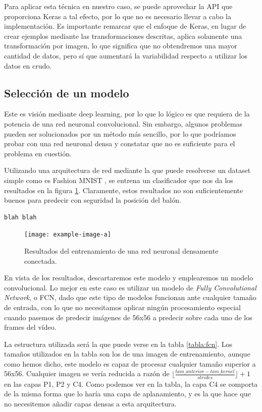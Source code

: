 Para aplicar esta técnica en nuestro caso, se puede aprovechar la API que proporciona Keras a tal efecto, por lo que no es necesario llevar a cabo la implementación. Es importante remarcar que el enfoque de Keras, en lugar de crear ejemplos mediante las transformaciones descritas, aplica solamente una transformación por imagen, lo que significa que no obtendremos una mayor cantidad de datos, pero sí que aumentará la variabilidad respecto a utilizar los datos en crudo.

\subsection{Selección de un modelo}

Este es visión mediante deep learning, por lo que lo lógico es que requiera de la potencia de una red neuronal convolucional. Sin embargo, algunos problemas pueden ser solucionados por un método más sencillo, por lo que podríamos probar con una red neuronal densa y constatar que no es suficiente para el problema en cuestión.

Utilizando una arquitectura de red mediante la que puede resolverse un dataset simple como es Fashion MNIST \cite{art:xiao2017fashionmnist}, se entrena un clasificador que nos da los resultados en la figura \ref{fig:dense}. Claramente, estos resultados no son suficientemente buenos para predecir con seguridad la posición del balón.

\renewcommand{\lstlistingname}{Código}
\begin{lstlisting}[caption={Arquitectura de la red densa.},captionpos=b]
  blah blah
\end{lstlisting}

\begin{figure}[H]
	\centering
  \texttt{[image: example-image-a]}
	\caption{Resultados del entrenamiento de una red neuronal densamente conectada.}
  \label{fig:dense}
\end{figure}

En vista de los resultados, descartaremos este modelo y emplearemos un modelo convolucional. Lo mejor en este caso es utilizar un modelo de \textit{Fully Convolutional Network}, o FCN, dado que este tipo de modelos funcionan ante cualquier tamaño de entrada, con lo que no necesitamos aplicar ningún procesamiento especial cuando pasemos de predecir imágenes de 56x56 a predecir sobre cada uno de los frames del vídeo. 

La estructura utilizada será la que puede verse en la tabla \ref{tabla:fcn}. Los tamaños utilizados en la tabla son los de una imagen de entrenamiento, aunque como hemos dicho, este modelo es capaz de procesar cualquier tamaño superior a 56x56. Cualquier imagen se vería reducida a razón de $\lfloor\frac{tam\_anterior - tam\_kernel}{strides}\rfloor+1$ en las capas P1, P2 y C4. Como podemos ver en la tabla, la capa C4 se comporta de la misma forma que lo haría una capa de aplanamiento, y es la que hace que no necesitemos añadir capas densas a esta arquitectura.

